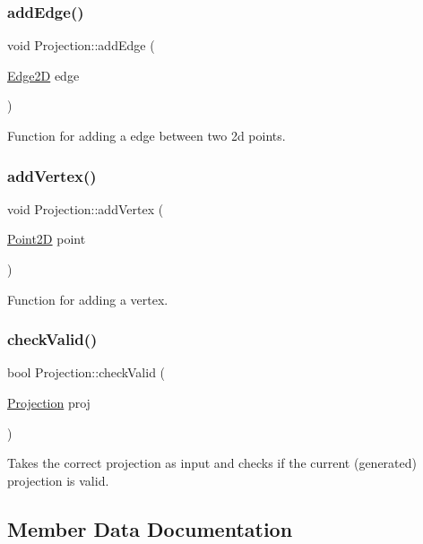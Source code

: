 \subsubsection{\texorpdfstring{add\+Edge()}{addEdge()}}
{\footnotesize\ttfamily void Projection\+::add\+Edge (\begin{DoxyParamCaption}\item[{\hyperlink{class_edge2_d}{Edge2D}}]{edge }\end{DoxyParamCaption})}

Function for adding a edge between two 2d points. \mbox{\label{class_projection_afd8f16005bfb9bd16052f579e7c5c422}} 
\subsubsection{\texorpdfstring{add\+Vertex()}{addVertex()}}
{\footnotesize\ttfamily void Projection\+::add\+Vertex (\begin{DoxyParamCaption}\item[{\hyperlink{class_point2_d}{Point2D}}]{point }\end{DoxyParamCaption})}

Function for adding a vertex. \mbox{\label{class_projection_a4936003f3ffbd4feeca8c5c08c018ffe}} 
\subsubsection{\texorpdfstring{check\+Valid()}{checkValid()}}
{\footnotesize\ttfamily bool Projection\+::check\+Valid (\begin{DoxyParamCaption}\item[{\hyperlink{class_projection}{Projection}}]{proj }\end{DoxyParamCaption})}

Takes the correct projection as input and checks if the current (generated) projection is valid. 

\subsection{Member Data Documentation}
\mbox{\label{class_projection_aca9e310187f814f0afcacb1c97bfae45}} 
